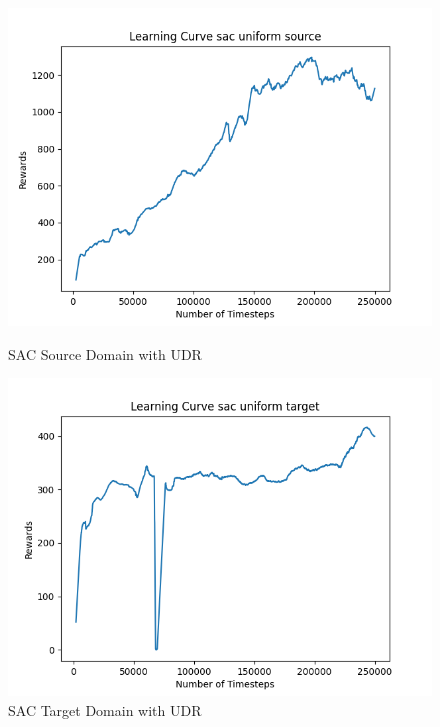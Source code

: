 \documentclass[11pt]{article}
\begin{document}
\begin{figure}[H]
    \centering
    \begin{minipage}{0.45\textwidth}
        \centering
        \includegraphics[width=\textwidth]{../images/Learning_Curve_SAC_Uniform_Source.png}
        \caption{SAC Source Domain with UDR }
        \label{fig:sac_source_udr}
    \end{minipage}
    \hfill
    \begin{minipage}{0.45\textwidth}
        \centering
        \includegraphics[width=\textwidth]{../images/Learning_Curve_SAC_Uniform_Target.png}
        \caption{SAC Target Domain with UDR}
        \label{fig:sac_target_udr}
    \end{minipage}

\end{figure}
\end{document}
